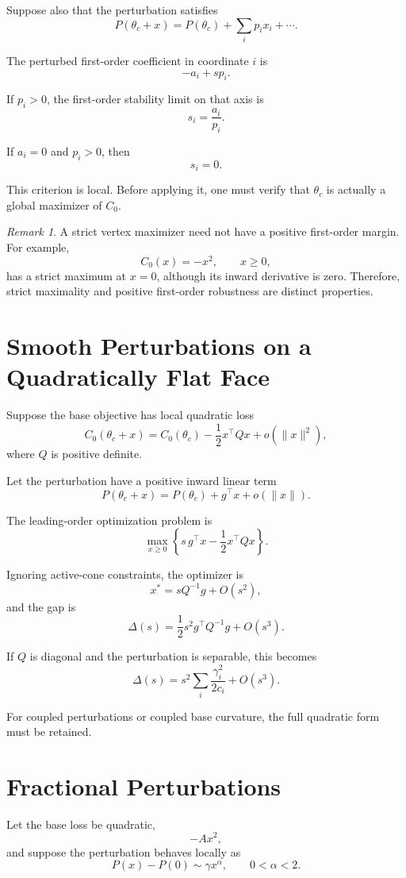 \documentclass[11pt]{article}
\theoremstyle{remark}
\newtheorem{remark}[theorem]{Remark}
\begin{document}
Suppose also that the perturbation satisfies
\[
P(\theta_c+x)
=
P(\theta_c)+\sum_i p_i x_i+\cdots.
\]

The perturbed first-order coefficient in coordinate $i$ is
\[
-a_i+sp_i.
\]

If $p_i>0$, the first-order stability limit on that axis is
\[
s_i=\frac{a_i}{p_i}.
\]

If $a_i=0$ and $p_i>0$, then
\[
s_i=0.
\]

This criterion is local. Before applying it, one must verify that $\theta_c$ is
actually a global maximizer of $C_0$.

\begin{remark}
A strict vertex maximizer need not have a positive first-order margin. For
example,
\[
C_0(x)=-x^2,\qquad x\geq0,
\]
has a strict maximum at $x=0$, although its inward derivative is zero.
Therefore, strict maximality and positive first-order robustness are distinct
properties.
\end{remark}

\section{Smooth Perturbations on a Quadratically Flat Face}

Suppose the base objective has local quadratic loss
\[
C_0(\theta_c+x)
=
C_0(\theta_c)-\frac12x^\top Qx+o(\|x\|^2),
\]
where $Q$ is positive definite.

Let the perturbation have a positive inward linear term
\[
P(\theta_c+x)
=
P(\theta_c)+g^\top x+o(\|x\|).
\]

The leading-order optimization problem is
\[
\max_{x\geq0}
\left\{
s\,g^\top x-\frac12x^\top Qx
\right\}.
\]

Ignoring active-cone constraints, the optimizer is
\[
x^*=sQ^{-1}g+O(s^2),
\]
and the gap is
\[
\Delta(s)
=
\frac12s^2g^\top Q^{-1}g+O(s^3).
\]

If $Q$ is diagonal and the perturbation is separable, this becomes
\[
\Delta(s)
=
s^2\sum_i\frac{\gamma_i^2}{2c_i}
+O(s^3).
\]

For coupled perturbations or coupled base curvature, the full quadratic form
must be retained.

\section{Fractional Perturbations}

Let the base loss be quadratic,
\[
-Ax^2,
\]
and suppose the perturbation behaves locally as
\[
P(x)-P(0)\sim\gamma x^\alpha,
\qquad 0<\alpha<2.
\]
\end{document}
